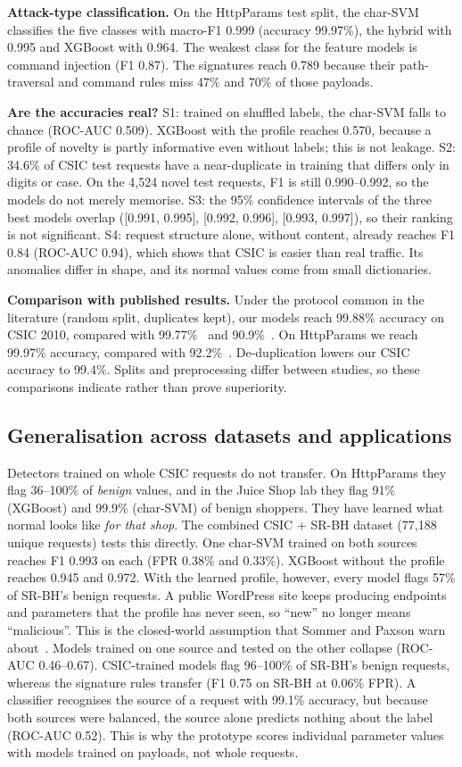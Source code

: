 \documentclass[conference]{IEEEtran}
\begin{document}
\textbf{Attack-type classification.} On the HttpParams test split, the char-SVM classifies the five
classes with macro-F1 0.999 (accuracy 99.97\%), the hybrid with 0.995 and XGBoost with 0.964. The
weakest class for the feature models is command injection (F1 0.87). The signatures reach 0.789
because their path-traversal and command rules miss 47\% and 70\% of those payloads.

\textbf{Are the accuracies real?} S1: trained on shuffled labels, the char-SVM falls to chance (ROC-AUC
0.509). XGBoost with the profile reaches 0.570, because a profile of novelty is partly informative even
without labels; this is not leakage. S2: 34.6\% of CSIC test requests have a near-duplicate in training
that differs only in digits or case. On the 4,524 novel test requests, F1 is still 0.990--0.992, so the models do not merely memorise.
S3: the 95\% confidence intervals of the three best models overlap ([0.991, 0.995], [0.992, 0.996],
[0.993, 0.997]), so their ranking is not significant. S4: request structure alone, without content,
already reaches F1 0.84 (ROC-AUC 0.94), which shows that CSIC is easier than real traffic. Its anomalies
differ in shape, and its normal values come from small dictionaries.

\textbf{Comparison with published results.} Under the protocol common in the literature (random split,
duplicates kept), our models reach 99.88\% accuracy on CSIC 2010, compared with 99.77\%~\cite{tadhani2024}
and 90.9\%~\cite{yang2025}. On HttpParams we reach 99.97\% accuracy, compared with 92.2\%~\cite{yang2025}.
De-duplication lowers our CSIC accuracy to 99.4\%. Splits and preprocessing differ between studies,
so these comparisons indicate rather than prove superiority.

\subsection{Generalisation across datasets and applications}
Detectors trained on whole CSIC requests do not transfer. On HttpParams they flag 36--100\% of
\emph{benign} values, and in the Juice Shop lab they flag 91\% (XGBoost) and 99.9\% (char-SVM) of benign
shoppers. They have learned what normal looks like \emph{for that shop}.
The combined CSIC + SR-BH dataset (77,188 unique requests) tests this directly. One char-SVM trained on
both sources reaches F1 0.993 on each (FPR 0.38\% and 0.33\%). XGBoost without the profile reaches 0.945 and
0.972. With the learned profile, however, every model flags 57\% of SR-BH's benign requests. A public
WordPress site keeps producing endpoints and parameters that the profile has never seen, so ``new''
no longer means ``malicious''. This is the closed-world assumption that Sommer and Paxson warn
about~\cite{sommer2010}. Models trained on one source and tested on the other collapse (ROC-AUC 0.46--0.67). CSIC-trained models flag 96--100\% of SR-BH's benign requests, whereas the signature rules transfer (F1 0.75 on SR-BH at 0.06\% FPR). A classifier recognises the source of a request with 99.1\% accuracy, but because both sources were balanced, the source alone predicts nothing about the label (ROC-AUC 0.52).
This is why the prototype scores individual parameter values with models trained on payloads, not
whole requests.
\end{document}
